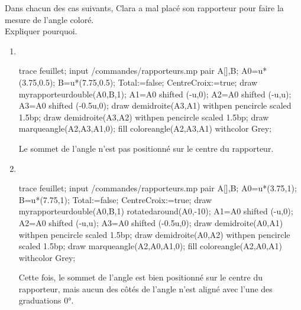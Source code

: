 \begin{corrige}
    Dans chacun des cas suivants, Clara a mal placé son rapporteur pour faire la mesure de l'angle coloré.\\
    Expliquer pourquoi.

    \begin{enumerate}
        \item \phantom{rrr}\\
        \begin{Geometrie}[CoinHD={(7.5u,4.5u)}]
            trace feuillet;
            input \persopath/commandes/rapporteurs.mp
            pair A[],B;
            A0=u*(3.75,0.5);
            B=u*(7.75,0.5);
            Total:=false;%
            CentreCroix:=true;%
            draw myrapporteurdouble(A0,B,1);        
            A1=A0 shifted (-u,0); 
            A2=A0 shifted (-u,u);
            A3=A0 shifted (-0.5u,0);
            draw demidroite(A3,A1) withpen pencircle scaled 1.5bp;
            draw demidroite(A3,A2) withpen pencircle scaled 1.5bp;
            draw marqueangle(A2,A3,A1,0);
            fill coloreangle(A2,A3,A1) withcolor Grey;
        \end{Geometrie}

        {\red Le sommet de l'angle n'est pas positionné sur le centre du rapporteur.}
        \item \phantom{rrr}\\
        \begin{Geometrie}[CoinHD={(7.5u,4.5u)}]
            trace feuillet;
            input \persopath/commandes/rapporteurs.mp
            pair A[],B;
            A0=u*(3.75,1);
            B=u*(7.75,1);
            Total:=false;%
            CentreCroix:=true;%
            draw myrapporteurdouble(A0,B,1) rotatedaround(A0,-10);
            A1=A0 shifted (-u,0); 
            A2=A0 shifted (-u,u);
            A3=A0 shifted (-0.5u,0);
            draw demidroite(A0,A1) withpen pencircle scaled 1.5bp;
            draw demidroite(A0,A2) withpen pencircle scaled 1.5bp;
            draw marqueangle(A2,A0,A1,0);
            fill coloreangle(A2,A0,A1) withcolor Grey;
        \end{Geometrie}

        {\red Cette fois, le sommet de l'angle est bien positionné sur le centre du rapporteur, mais aucun des côtés de l'angle n'est aligné avec l'une des graduations \ang{0}.}
    \end{enumerate}
\end{corrige}
    